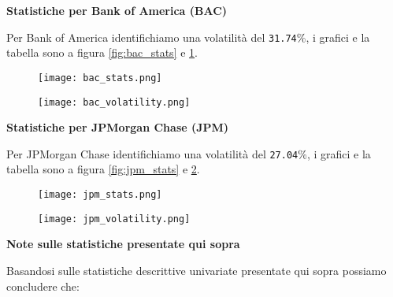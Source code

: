 \pagebreak

\textbf{Statistiche per Bank of America (BAC)}

Per Bank of America identifichiamo una volatilità del \verb|31.74|\%, i grafici e la tabella sono a figura \ref{fig:bac_stats} e \ref{fig:bac_vol}.

\begin{figure}[h]
  \centering
  \begin{minipage}{.5\textwidth}
    \centering
    \vspace{4.35cm}
    \texttt{[image: bac\_stats.png]}
    \label{fig:bac_stats}
  \end{minipage}%
  \begin{minipage}{.5\textwidth}
    \centering
    \texttt{[image: bac\_volatility.png]}
    \label{fig:bac_vol}
  \end{minipage}
\end{figure}

\textbf{Statistiche per JPMorgan Chase (JPM)}

Per JPMorgan  Chase identifichiamo una volatilità del \verb|27.04|\%, i grafici e la tabella sono a figura \ref{fig:jpm_stats} e \ref{fig:jpm_vol}.

\begin{figure}[h]
  \centering
  \begin{minipage}{.5\textwidth}
    \centering
    \vspace{4.35cm}
    \texttt{[image: jpm\_stats.png]}
    \label{fig:jpm_stats}
  \end{minipage}%
  \begin{minipage}{.5\textwidth}
    \centering
    \texttt{[image: jpm\_volatility.png]}
    \label{fig:jpm_vol}
  \end{minipage}
\end{figure}

\textbf{Note sulle statistiche presentate qui sopra}

Basandosi sulle statistiche descrittive univariate presentate qui sopra possiamo concludere che:

